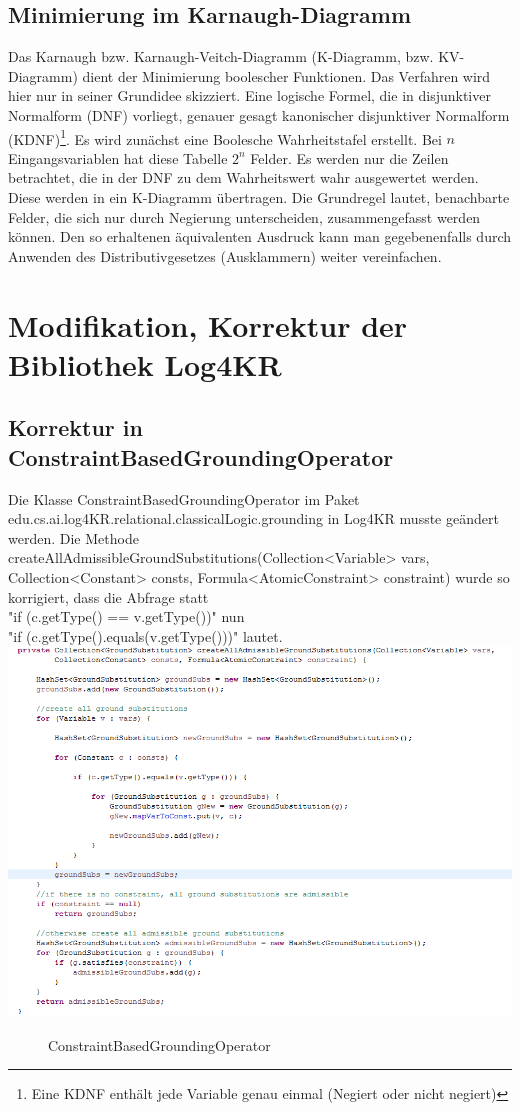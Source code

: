 \documentclass[a4paper, 11pt]{book}
\begin{document}
{	\section{Minimierung im Karnaugh-Diagramm}\label{Min_K_Dia} 
	Das Karnaugh bzw. Karnaugh-Veitch-Diagramm (K-Diagramm, bzw. KV-Diagramm) dient der Minimierung boolescher Funktionen. Das Verfahren wird hier nur in seiner Grundidee skizziert. Eine logische Formel, die in disjunktiver Normalform (DNF) vorliegt, genauer gesagt kanonischer disjunktiver Normalform (KDNF)\footnote{Eine KDNF enthält jede Variable genau einmal (Negiert oder nicht negiert)}. Es wird zunächst eine Boolesche Wahrheitstafel erstellt. Bei $ n $ Eingangsvariablen hat diese Tabelle $ 2^{n} $ Felder. Es werden nur die Zeilen betrachtet, die in der DNF zu dem Wahrheitswert wahr ausgewertet werden. Diese werden in ein K-Diagramm übertragen.  Die Grundregel lautet, benachbarte Felder, die sich nur durch Negierung unterscheiden, zusammengefasst werden können. Den so erhaltenen äquivalenten Ausdruck kann man gegebenenfalls durch Anwenden des Distributivgesetzes (Ausklammern) weiter vereinfachen.
}
\chapter{Modifikation, Korrektur der Bibliothek Log4KR}
\section{Korrektur in ConstraintBasedGroundingOperator}
\label{sec:Korrektur1}
Die Klasse ConstraintBasedGroundingOperator im Paket edu.cs.ai.log4KR.relational.classicalLogic.grounding in Log4KR musste geändert werden. Die Methode createAllAdmissibleGroundSubstitutions(Collection<Variable> vars,
Collection<Constant> consts, Formula<AtomicConstraint> constraint) wurde so korrigiert, dass die Abfrage statt\\
 "{}if (c.getType() == v.getType())"{} 
nun \\
"{}if (c.getType().equals(v.getType()))"{} lautet.\\
\includegraphics[scale = 1.0]{Graphics/Aenderung_1}
\begin{figure}[h]
	\caption{ConstraintBasedGroundingOperator}
\end{figure}
\end{document}
